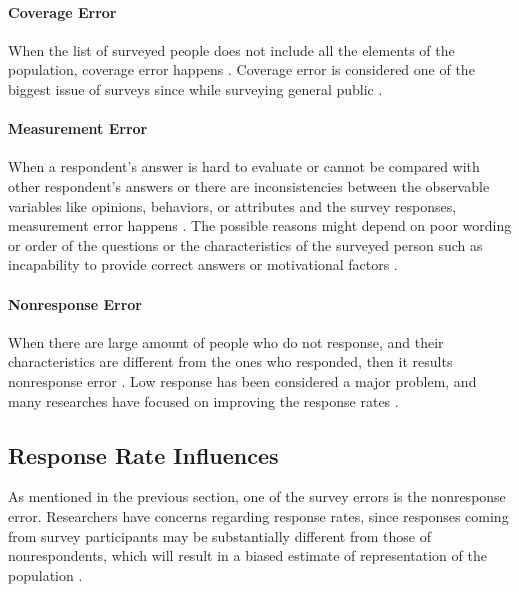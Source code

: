 \paragraph{Coverage Error}
When the list of surveyed people does not include all the elements of the population, coverage error happens \citep[page 9]{Dillman2006}. Coverage error is considered one of the biggest issue of surveys since while surveying general public \citep{Dillman1991}.

\paragraph{Measurement Error}
When a respondent's answer is hard to evaluate or cannot be compared with other respondent's answers or there are inconsistencies between the observable variables like opinions, behaviors, or attributes and the survey responses, measurement error happens \citep[page 9]{Dillman2006} \citep{Dillman1991}. The possible reasons might depend on poor wording or order of the questions or the characteristics of the surveyed person such as incapability to provide correct answers or motivational factors \citep{Dillman1991}.

\paragraph{Nonresponse Error}
When there are large amount of people who do not response, and their characteristics are different from the ones who responded, then it results nonresponse error \citep[page 9]{Dillman2006}. Low response has been considered a major problem, and many researches have focused on improving the response rates \citep{Dillman1991}.

\subsection{Response Rate Influences}
\label{sec:2.1.3:ResRatInf}

As mentioned in the previous section, one of the survey errors is the nonresponse error. Researchers have concerns regarding response rates, since responses coming from survey participants may be substantially different from those of nonrespondents, which will result in a biased estimate of representation of the population \citep{Bogen1996}.
\vspace{1cm}

